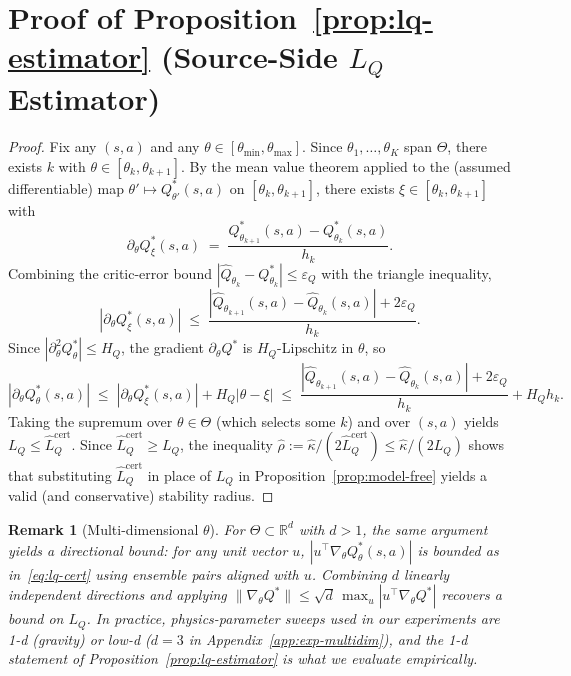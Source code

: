 \documentclass{article}
\newtheorem{remark}{Remark}
\newcommand{\R}{\mathbb{R}}
\begin{document}
\section{Proof of Proposition~\ref{prop:lq-estimator} (Source-Side $L_Q$ Estimator)}
\label{app:lq-estimator-proof}

\begin{proof}
Fix any $(s,a)$ and any $\theta \in [\theta_{\min}, \theta_{\max}]$. Since $\theta_1, \ldots, \theta_K$ span $\Theta$, there exists $k$ with $\theta \in [\theta_k, \theta_{k+1}]$. By the mean value theorem applied to the (assumed differentiable) map $\theta' \mapsto Q^*_{\theta'}(s,a)$ on $[\theta_k, \theta_{k+1}]$, there exists $\xi \in [\theta_k, \theta_{k+1}]$ with
\[
\partial_\theta Q^*_\xi(s,a) \;=\; \frac{Q^*_{\theta_{k+1}}(s,a) - Q^*_{\theta_k}(s,a)}{h_k}.
\]
Combining the critic-error bound $|\hat Q_{\theta_k} - Q^*_{\theta_k}| \leq \varepsilon_Q$ with the triangle inequality,
\[
|\partial_\theta Q^*_\xi(s,a)| \;\leq\; \frac{|\hat Q_{\theta_{k+1}}(s,a) - \hat Q_{\theta_k}(s,a)| + 2\varepsilon_Q}{h_k}.
\]
Since $|\partial^2_\theta Q^*_\theta| \leq H_Q$, the gradient $\partial_\theta Q^*$ is $H_Q$-Lipschitz in $\theta$, so
\[
|\partial_\theta Q^*_\theta(s,a)| \;\leq\; |\partial_\theta Q^*_\xi(s,a)| + H_Q |\theta - \xi| \;\leq\; \frac{|\hat Q_{\theta_{k+1}}(s,a) - \hat Q_{\theta_k}(s,a)| + 2\varepsilon_Q}{h_k} + H_Q h_k.
\]
Taking the supremum over $\theta \in \Theta$ (which selects some $k$) and over $(s,a)$ yields $L_Q \leq \hat L_Q^{\mathrm{cert}}$. Since $\hat L_Q^{\mathrm{cert}} \geq L_Q$, the inequality $\hat\rho := \hat\kappa/(2 \hat L_Q^{\mathrm{cert}}) \leq \hat\kappa/(2 L_Q)$ shows that substituting $\hat L_Q^{\mathrm{cert}}$ in place of $L_Q$ in Proposition~\ref{prop:model-free} yields a valid (and conservative) stability radius.
\end{proof}

\begin{remark}[Multi-dimensional $\theta$]
\label{rem:lq-multidim}
For $\Theta \subset \R^d$ with $d > 1$, the same argument yields a directional bound: for any unit vector $u$, $|u^\top \nabla_\theta Q^*_\theta(s,a)|$ is bounded as in~\eqref{eq:lq-cert} using ensemble pairs aligned with $u$. Combining $d$ linearly independent directions and applying $\|\nabla_\theta Q^*\| \leq \sqrt{d}\, \max_u |u^\top \nabla_\theta Q^*|$ recovers a bound on $L_Q$. In practice, physics-parameter sweeps used in our experiments are 1-d (gravity) or low-d ($d=3$ in Appendix~\ref{app:exp-multidim}), and the 1-d statement of Proposition~\ref{prop:lq-estimator} is what we evaluate empirically.
\end{remark}
\end{document}
